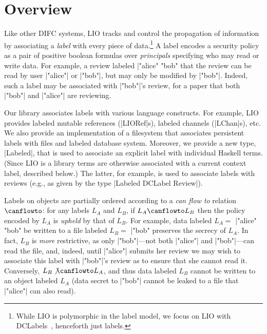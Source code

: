 \section{Overview}
\label{sec:overview}

Like other DIFC systems, LIO tracks and control the propagation of
information by associating a \emph{label} with every piece of
data.\footnote{
  While LIO is polymorphic in the label model, we focus on LIO with
  DCLabels~\cite{dclabels}, henceforth just labels. 
}
%
A label encodes a security policy as a pair of positive boolean
formulas over \emph{principals} specifying who may read or write data.
%
For example, a review labeled \hs|"alice" \/ "bob" %
that the review can be read by user \hs|"alice"| or \hs|"bob"|, but
may only be modified by \hs|"bob"|.
%
Indeed, such a label may be associated with \hs|"bob"|'s review, for a
paper that both \hs|"bob"| and \hs|"alice"| are reviewing.
%

Our library associates labels with various language constructs.
%
For example, LIO provides labeled mutable references (\hs|LIORef|s),
labeled channels (\hs|LChan|s), etc.
%
We also provide an implementation of a filesystem that associates
persistent labels with files and labeled database system.
%
Moreover, we provide a new type, \hs|Labeled|, that is used to
associate an explicit label with individual Haskell terms.
%
(Since LIO is a library terms are otherwise associated with a current
context label, described below.)
%
The latter, for example, is used to associate labels with reviews (e.g.,
as given by the type \hs|Labeled DCLabel Review|).

Labels on objects are partially ordered according to a {\em can flow
  to} relation $\canflowto$: for any labels $L_A$ and $L_B$, if $L_A
  \canflowto L_B$ then the policy encoded by $L_A$ is \emph{upheld}
  by that of $L_B$.
%
For example, data labeled $L_A =$ \hs|"alice" \/ "bob" %
be written to a file labeled $L_B =$ \hs|"bob" %
preserves the secrecy of $L_A$.
%
In fact, $L_B$ is \emph{more} restrictive, as only
\hs|"bob"|---not both \hs|"alice"| and \hs|"bob"|---can read the file,
and, indeed, until \hs|"alice"| submits her review we may wish to
associate this label with \hs|"bob"|'s review as to ensure that she
cannot read it.
%
Conversely, $L_B \not\canflowto L_A$, and thus data labeled $L_B$
cannot be written to an object labeled $L_A$ (data secret to
\hs|"bob"| cannot be leaked to a file that \hs|"alice"| can also
read).

